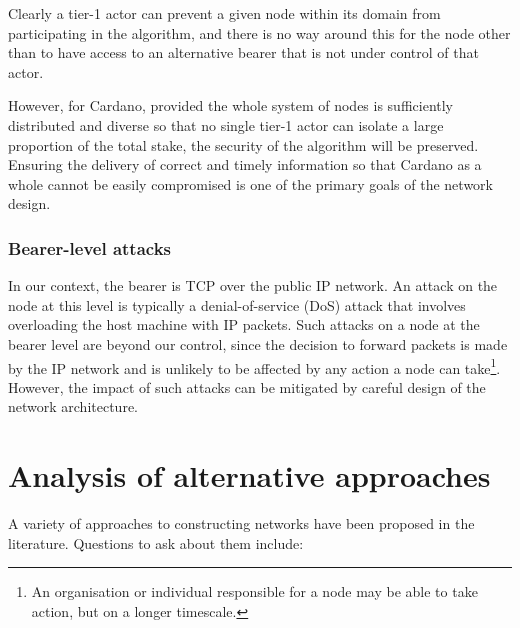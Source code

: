 \documentclass[11pt,a4paper]{article}
\begin{document}
Clearly a tier-1 actor can prevent a given node within its domain from
participating in the algorithm, and there is no way around this for the
node other than to have access to an alternative bearer that is not
under control of that actor.

However, for Cardano, provided the whole system of nodes is sufficiently
distributed and diverse so that no single tier-1 actor can isolate a
large proportion of the total stake, the security of the algorithm will
be preserved. Ensuring the delivery of correct and timely information so
that Cardano as a whole cannot be easily compromised is one of the
primary goals of the network design.

\subsubsection{Bearer-level attacks}
\label{bearer-level-attacks}

In our context, the bearer is TCP over the public IP network. An attack
on the node at this level is typically a denial-of-service (DoS) attack
that involves overloading the host machine with IP packets. Such attacks
on a node at the bearer level are beyond our control, since the decision
to forward packets is made by the IP network and is unlikely to be
affected by any action a node can take\footnote{An organisation or
  individual responsible for a node may be able to take action, but on a
  longer timescale.}. However, the impact of such attacks can be
mitigated by careful design of the network architecture.

\section{Analysis of alternative approaches}
\label{analysis-of-alternative-approaches}

A variety of approaches to constructing networks have been proposed in
the literature. Questions to ask about them include:
\end{document}
